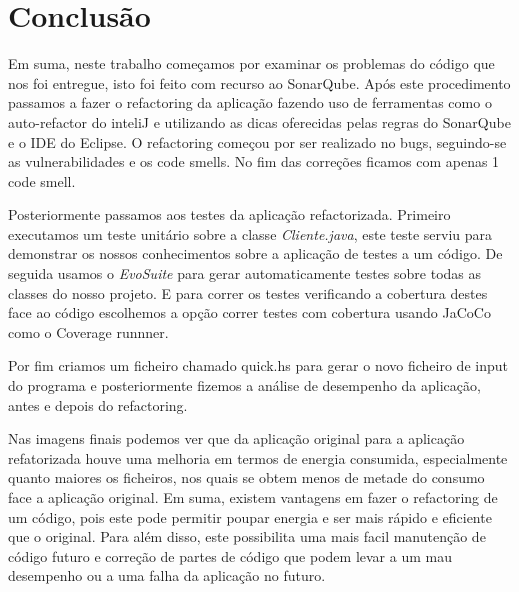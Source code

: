 \vspace{1cm}
\section{Conclusão}
\hfill\newline
\par Em suma, neste trabalho começamos por examinar os problemas do código que nos foi entregue, isto foi feito com recurso ao SonarQube. Após este procedimento passamos a fazer o refactoring da aplicação fazendo uso de ferramentas como o auto-refactor do inteliJ e utilizando as dicas oferecidas pelas regras do SonarQube e o IDE do Eclipse. O refactoring começou por ser realizado no bugs, seguindo-se as vulnerabilidades e os code smells. No fim das correções ficamos com apenas 1 code smell. \newline
\par Posteriormente passamos aos testes da aplicação refactorizada. Primeiro executamos um teste unitário sobre a classe \textit{Cliente.java}, este teste serviu para demonstrar os nossos conhecimentos sobre a aplicação de testes a um código. De seguida usamos o \textit{EvoSuite} para gerar automaticamente testes sobre todas as classes do nosso projeto. E para correr os testes verificando a cobertura destes face ao código escolhemos a opção correr testes com cobertura usando JaCoCo como o Coverage runnner.\newline
\par Por fim criamos um ficheiro chamado quick.hs para gerar o novo ficheiro de input do programa e posteriormente fizemos a análise de desempenho da aplicação, antes e depois do refactoring.\newline
\par Nas imagens finais podemos ver que da aplicação original para a aplicação refatorizada houve uma melhoria em termos de energia consumida, especialmente quanto maiores os ficheiros, nos quais se obtem menos de metade do consumo face a aplicação original.\newline
Em suma, existem vantagens em fazer o refactoring de um código, pois este pode permitir poupar energia e ser mais rápido e eficiente que o original. Para além disso, este possibilita uma mais facil manutenção de código futuro e correção de partes de código que podem levar a um mau desempenho ou a uma falha da aplicação no futuro.

